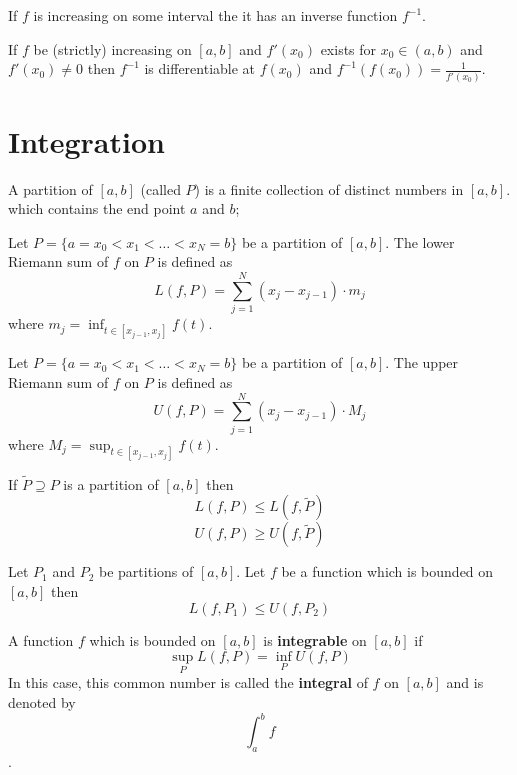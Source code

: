\begin{theorem*}
  If $f$ is increasing on some interval the it has an inverse function $f^{-1}$.
\end{theorem*}

\begin{theorem*}
  If $f$ be (strictly) increasing on $[a, b]$ and $f'(x_0)$ exists for $x_0 \in (a, b)$ and $f'(x_0) \neq 0$ then 
  $f^{-1}$ is differentiable at $f(x_0)$ and $f^{-1}(f(x_0)) = \frac{1}{f'(x_0)}$. 
\end{theorem*}

\section*{Integration}
\begin{definition*}[Partition]
  A partition of $[a, b]$ (called $P$) is a finite collection of distinct numbers in $[a, b]$. 
  which contains the end point $a$ and $b$;
\end{definition*}

\begin{definition*}
  Let $P = \{a = x_0 < x_1 < \dotsc < x_N = b \}$ be a partition of $[a, b]$.
  The lower Riemann sum of $f$ on $P$ is defined as
  \[ L(f, P) = \sum_{j=1}^N (x_j - x_{j-1}) \cdot m_j \]
  where $\displaystyle m_j = \inf_{t \in {[x_{j-1}, x_j]}} f(t)$.
\end{definition*}

\begin{definition*}
  Let $P = \{a = x_0 < x_1 < \dotsc < x_N = b \}$ be a partition of $[a, b]$.
  The upper Riemann sum of $f$ on $P$ is defined as
  \[ U(f, P) = \sum_{j=1}^N (x_j - x_{j-1}) \cdot M_j \]
  where $\displaystyle M_j = \sup_{t \in {[x_{j-1}, x_j]}} f(t)$.
\end{definition*}

\begin{theorem*}
  If $\tilde{P} \supseteq P$ is a partition of $[a, b]$ then \[L(f, P) \le L(f, \tilde{P})\] \[U(f, P) \ge U(f, \tilde{P})\]
\end{theorem*}

\begin{theorem*}
  Let $P_1$ and $P_2$ be partitions of $[a, b]$.
  Let $f$ be a function which is bounded on $[a, b]$ then 
  \[L(f, P_1) \le U(f, P_2)\]
\end{theorem*}

\begin{definition*}
  A function $f$ which is bounded on $[a, b]$ is \textbf{integrable} on $[a, b]$ if 
  \[\sup_P L(f, P) = \inf_P U(f, P)\]
  In this case, this common number is called the \textbf{integral} of $f$ on $[a, b]$ and is denoted by \[\int_a^b f\].
\end{definition*}

